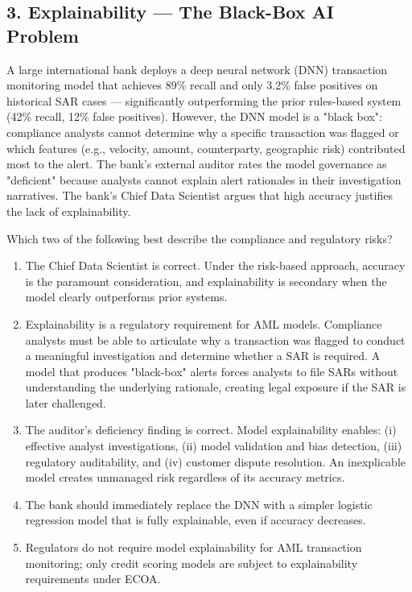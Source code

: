 \documentclass[11pt,a4paper]{article}
\begin{document}
	\subsection{3. Explainability — The Black-Box AI Problem}
	
	A large international bank deploys a deep neural network (DNN) transaction monitoring model that achieves 89\% recall and only 3.2\% false positives on historical SAR cases — significantly outperforming the prior rules-based system (42\% recall, 12\% false positives). However, the DNN model is a "black box": compliance analysts cannot determine why a specific transaction was flagged or which features (e.g., velocity, amount, counterparty, geographic risk) contributed most to the alert. The bank's external auditor rates the model governance as "deficient" because analysts cannot explain alert rationales in their investigation narratives. The bank's Chief Data Scientist argues that high accuracy justifies the lack of explainability.
	
	Which two of the following best describe the compliance and regulatory risks?
	
	\begin{enumerate}[label=\Alph*.]
		\item The Chief Data Scientist is correct. Under the risk-based approach, accuracy is the paramount consideration, and explainability is secondary when the model clearly outperforms prior systems.
		\item Explainability is a regulatory requirement for AML models. Compliance analysts must be able to articulate why a transaction was flagged to conduct a meaningful investigation and determine whether a SAR is required. A model that produces "black-box" alerts forces analysts to file SARs without understanding the underlying rationale, creating legal exposure if the SAR is later challenged.
		\item The auditor's deficiency finding is correct. Model explainability enables: (i) effective analyst investigations, (ii) model validation and bias detection, (iii) regulatory auditability, and (iv) customer dispute resolution. An inexplicable model creates unmanaged risk regardless of its accuracy metrics.
		\item The bank should immediately replace the DNN with a simpler logistic regression model that is fully explainable, even if accuracy decreases.
		\item Regulators do not require model explainability for AML transaction monitoring; only credit scoring models are subject to explainability requirements under ECOA.
	\end{enumerate}
	
\end{document}
